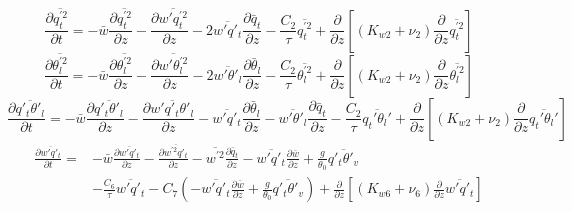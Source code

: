 \documentclass[11pt,fleqn]{article}
\newcommand{\ptlder}[2]{\frac{\partial #1}{\partial #2}}
\begin{document}
%
\begin{equation}
\label{eq_qtp2}
\ptlder{\overline{q_t^{'2}}}{t}
= - \bar{w}\ptlder{\overline{q^{'2}_t}}{z}	  
  - \ptlder{\overline{w'q_t^{'2}}}{z}
  - 2\overline{w'q'_t}\ptlder{\bar{q}_t}{z} 
  - \dfrac{C_2}{\tau} \overline{q_t^{'2}}
  + \ptlder{}{z} \left[ \left( K_{w2} + \nu_2 \right)
                        \ptlder{}{z} \overline{q_t^{'2}} 
                 \right]
\end{equation}
%
\begin{equation}
\label{eq_thlp2}
\ptlder{\overline{\theta_l^{'2}}}{t}
= - \bar{w}\ptlder{\overline{\theta^{'2}_l}}{z}	 
  - \ptlder{\overline{w'\theta_l^{'2}}}{z}
  - 2\overline{w'\theta'_l}\ptlder{\bar{\theta}_l}{z} 
  - \dfrac{C_2}{\tau} \overline{\theta_l^{'2}}
  + \ptlder{}{z} \left[ \left( K_{w2} + \nu_2 \right)
                        \ptlder{}{z} \overline{\theta_l^{'2}} 
                 \right]
\end{equation}
%
\begin{equation}
\label{eq_qtpthlp}
\ptlder{\overline{q'_t\theta'_l}}{t}
= - \bar{w}\ptlder{\overline{q'_t\theta'_l}}{z}	 
  - \ptlder{\overline{w'q'_t\theta'_l}}{z}
  - \overline{w'q'_t}\ptlder{\bar{\theta}_l}{z} 
  - \overline{w'\theta'_l}\ptlder{\bar{q}_t}{z}
  - \dfrac{C_2}{\tau} \overline{q_t' \theta_l'}
  + \ptlder{}{z} \left[ \left( K_{w2} + \nu_2 \right)
                        \ptlder{}{z} \overline{q_t' \theta_l'} 
                 \right]
\end{equation}
%
\begin{equation}
\label{eq_wpqtp}
\begin{split}
\ptlder{\overline{w'q'_t}}{t} 
= & - \bar{w}\ptlder{\overline{w'q'_t}}{z}	 		
    - \ptlder{\overline{w^{'2}q'_t}}{z}
    - \overline{w^{'2}}\ptlder{\bar{q}_t}{z} 
    - \overline{w'q'_t}\ptlder{\bar{w}}{z}
    + \frac{g}{\theta_0} \overline{q'_t\theta'_v} \\
  & - \frac{C_6}{\tau}\overline{w'q'_t}
    - C_7 \left(
             - \overline{w'q'_t}\ptlder{\bar{w}}{z}
             + \frac{g}{\theta_0} \overline{q'_t\theta'_v}
          \right) 
    + \ptlder{}{z} \left[ \left( K_{w6} + \nu_6 \right)
                          \ptlder{}{z} \overline{w'q'_t} 
                   \right]
\end{split}
\end{equation}
%
\end{document}
